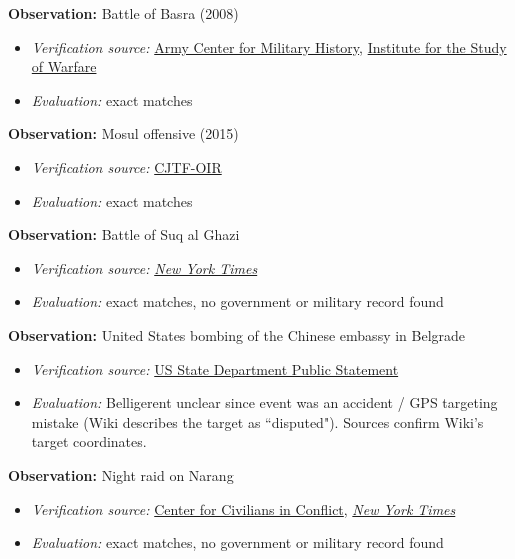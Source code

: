 \documentclass[fleqn,12pt]{article}
\begin{document}
\vspace{-.3cm}
\noindent
\textbf{Observation:} Battle of Basra (2008)
\begin{itemize}
    \item \textit{Verification source:} \href{{https://history.army.mil/html/books/059/59-3-1/CMH_59-3-1.pdf}}{Army Center for Military History}, \href{https://www.understandingwar.org/report/battle-basra}{Institute for the Study of Warfare}
    \item \textit{Evaluation:} exact matches
\end{itemize}

\vspace{-.3cm}
\noindent
\textbf{Observation:} Mosul offensive (2015)
\begin{itemize}
    \item \textit{Verification source:} \href{https://www.inherentresolve.mil/NEWSROOM/Strike-Releases/}{CJTF-OIR}
    \item \textit{Evaluation:} exact matches
\end{itemize}

\vspace{-.3cm}
\noindent
\textbf{Observation:} Battle of Suq al Ghazi
\begin{itemize}
    \item \textit{Verification source:} \href{https://www.nytimes.com/2014/09/16/world/middleeast/us-airstrikes-hit-targets-near-baghdad-held-by-isis.html?_r=0}{\textit{New York Times}}
    \item \textit{Evaluation:} exact matches, no government or military record found
\end{itemize}

\vspace{-.3cm}
\noindent
\textbf{Observation:} United States bombing of the Chinese embassy in Belgrade
\begin{itemize}
    \item \textit{Verification source:} \href{https://1997-2001.state.gov/policy_remarks/1999/990617_pickering_emb.html}{US State Department Public Statement}
    \item \textit{Evaluation:} Belligerent unclear since event was an accident / GPS targeting mistake (Wiki describes the target as ``disputed"). Sources confirm Wiki's target coordinates.
\end{itemize}

\vspace{-.3cm}
\noindent
\textbf{Observation:} Night raid on Narang
\begin{itemize}
    \item \textit{Verification source:} \href{https://civiliansinconflict.org/wp-content/uploads/2021/10/In-Search-of-Answers-Report_Amended.pdf}{Center for Civilians in Conflict}, \href{https://www.nytimes.com/2009/12/31/world/asia/31afghan.html}{\textit{New York Times}}
    \item \textit{Evaluation:} exact matches, no government or military record found
\end{itemize}
\end{document}
